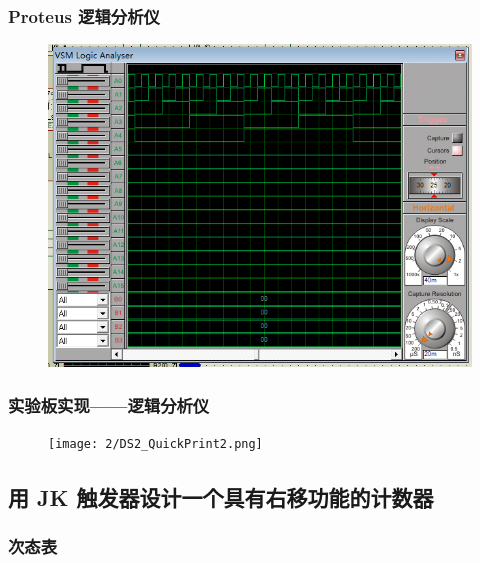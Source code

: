 \documentclass{article}
\begin{document}
\subsubsection{Proteus 逻辑分析仪}

\begin{figure}[!hbp]
  \centering
  \includegraphics[scale=0.5]{2/2.png}
\end{figure}

\newpage

\subsubsection{实验板实现——逻辑分析仪}

\begin{figure}[!hbp]
  \centering
  \texttt{[image: 2/DS2\_QuickPrint2.png]}
\end{figure}

\newpage

\subsection{用 JK 触发器设计一个具有右移功能的计数器}


\subsubsection{次态表}
\end{document}
